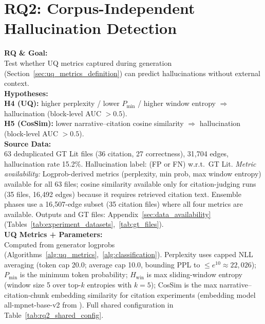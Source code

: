 \section{RQ2: Corpus-Independent Hallucination Detection}
\label{sec:rq2_experiments}

\noindent\textbf{RQ \& Goal:}\\
Test whether UQ metrics captured during generation (Section~\ref{sec:uq_metrics_definition}) can predict hallucinations without external context.\\
\textbf{Hypotheses:}\\
\textbf{H4 (UQ):} higher perplexity / lower $P_{\min}$ / higher window entropy $\Rightarrow$ hallucination (block-level AUC $>0.5$).\\
\textbf{H5 (CosSim):} lower narrative--citation cosine similarity $\Rightarrow$ hallucination (block-level AUC $>0.5$).\\
\textbf{Source Data:}\\
63 deduplicated GT Lit files (36 citation, 27 correctness), 31{,}704 edges, hallucination rate 15.2\%. Hallucination label: (FP or FN) w.r.t.\ GT Lit. \textit{Metric availability:} Logprob-derived metrics (perplexity, min prob, max window entropy) available for all 63 files; cosine similarity available only for citation-judging runs (35 files, 16{,}492 edges) because it requires retrieved citation text. Ensemble phases use a 16{,}507-edge subset (35 citation files) where all four metrics are available. Outputs and GT files: Appendix~\ref{sec:data_availability} (Tables~\ref{tab:experiment_datasets},~\ref{tab:gt_files}).\\
\textbf{UQ Metrics + Parameters:}\\
Computed from generator logprobs (Algorithms~\ref{alg:uq_metrics},~\ref{alg:classification}). Perplexity uses capped NLL averaging (token cap 20.0; average cap 10.0, bounding PPL to $\le e^{10}\approx22{,}026$); $P_{\min}$ is the minimum token probability; $H_{\text{win}}$ is max sliding-window entropy (window size 5 over top-$k$ entropies with $k{=}5$); CosSim is the max narrative--citation-chunk embedding similarity for citation experiments (embedding model all-mpnet-base-v2 from \cite{muennighoff2023mteb}). Full shared configuration in Table~\ref{tab:rq2_shared_config}.

